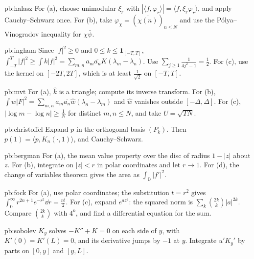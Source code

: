 \begin{hint}{pb:halasz}
For (a), choose unimodular $\xi_r$ with $|\langle f,\varphi_r\rangle|=\langle f,\xi_r\varphi_r\rangle$, and apply Cauchy--Schwarz once. For (b), take $\varphi_\chi=(\overline{\chi(n)})_{n\le N}$
and use the Pólya--Vinogradov inequality for $\chi\overline\psi$.
\end{hint}

\begin{hint}{pb:ingham}
Since $|f|^2\ge0$ and $0\le k\le\mathbf 1_{[-T,T]}$, $\int_{-T}^T|f|^2\ge\int k|f|^2=\sum_{m,n}a_m\overline{a_n}K(\lambda_m-\lambda_n)$. Use $\sum_{j\ge1}\frac1{4j^2-1}=\frac12$. For (c), use the kernel
on $[-2T,2T]$, which is at least $\frac1{\sqrt2}$ on $[-T,T]$.
\end{hint}

\begin{hint}{pb:mvt}
For (a), $\hat k$ is a triangle; compute its inverse transform. For (b), $\int w|F|^2=\sum_{m,n}a_m\overline{a_n}\hat w(\lambda_n-\lambda_m)$ and $\hat w$ vanishes outside $[-\Delta,\Delta]$.
For (c), $|\log m-\log n|\ge\frac1N$ for distinct $m,n\le N$, and take $U=\sqrt{TN}$.
\end{hint}

\begin{hint}{pb:christoffel}
Expand $p$ in the orthogonal basis $(P_k)$. Then $p(1)=\langle p,K_n(\cdot,1)\rangle$, and Cauchy--Schwarz.
\end{hint}

\begin{hint}{pb:bergman}
For (a), the mean value property over the disc of radius $1-|z|$ about $z$. For (b), integrate on $|z|<r$ in polar coordinates and let $r\to1$. For (d), the
change of variables theorem gives the area as $\int_{\mathbb D}|f'|^2$.
\end{hint}

\begin{hint}{pb:fock}
For (a), use polar coordinates; the substitution $t=r^2$ gives $\int_0^\infty r^{2n+1}e^{-r^2}\dd r=\frac{n!}2$. For (c), expand $e^{az^2}$: the squared norm is $\sum_k\binom{2k}k|a|^{2k}$. Compare $\binom{2k}k$ with $4^k$, and find a differential equation for the sum.
\end{hint}

\begin{hint}{pb:sobolev}
$K_y$ solves $-K''+K=0$ on each side of $y$, with $K'(0)=K'(L)=0$, and its derivative jumps by $-1$ at $y$. Integrate $u'K_y'$ by parts on $[0,y]$ and $[y,L]$.
\end{hint}

